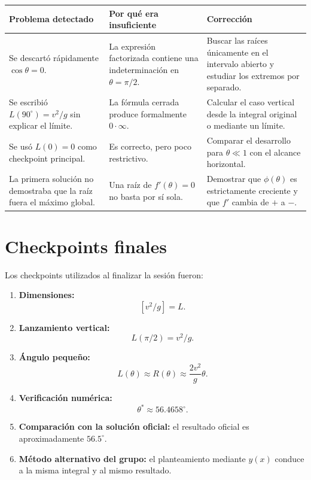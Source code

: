 \begin{center}
\begin{tabular}{p{4.2cm}p{5.2cm}p{5.2cm}}
\toprule
\textbf{Problema detectado} & \textbf{Por qué era insuficiente} & \textbf{Corrección}\\
\midrule
Se descartó rápidamente \(\cos\theta=0\). &
La expresión factorizada contiene una indeterminación en \(\theta=\pi/2\). &
Buscar las raíces únicamente en el intervalo abierto y estudiar los extremos por separado.\\
\addlinespace
Se escribió \(L(90^\circ)=v^2/g\) sin explicar el límite. &
La fórmula cerrada produce formalmente \(0\cdot\infty\). &
Calcular el caso vertical desde la integral original o mediante un límite.\\
\addlinespace
Se usó \(L(0)=0\) como checkpoint principal. &
Es correcto, pero poco restrictivo. &
Comparar el desarrollo para \(\theta\ll1\) con el alcance horizontal.\\
\addlinespace
La primera solución no demostraba que la raíz fuera el máximo global. &
Una raíz de \(f'(\theta)=0\) no basta por sí sola. &
Demostrar que \(\phi(\theta)\) es estrictamente creciente y que \(f'\) cambia de \(+\) a \(-\).\\
\bottomrule
\end{tabular}
\end{center}

\section{Checkpoints finales}

Los checkpoints utilizados al finalizar la sesión fueron:

\begin{enumerate}
    \item \textbf{Dimensiones:}
    \[
    [v^2/g]=L.
    \]
    \item \textbf{Lanzamiento vertical:}
    \[
    L(\pi/2)=v^2/g.
    \]
    \item \textbf{Ángulo pequeño:}
    \[
    L(\theta)\approx R(\theta)\approx\frac{2v^2}{g}\theta.
    \]
    \item \textbf{Verificación numérica:}
    \[
    \theta^*\approx56.4658^\circ.
    \]
    \item \textbf{Comparación con la solución oficial:} el resultado oficial es aproximadamente \(56.5^\circ\).
    \item \textbf{Método alternativo del grupo:} el planteamiento mediante \(y(x)\) conduce a la misma integral y al mismo resultado.
\end{enumerate}

